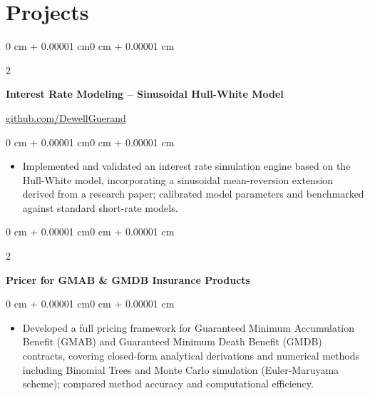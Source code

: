 \documentclass[10pt, letterpaper]{article}
\newenvironment{highlights}{
    \begin{itemize}[
        topsep=0.06 cm,
        parsep=0.06 cm,
        partopsep=0pt,
        itemsep=0pt,
        leftmargin=0 cm + 10pt
    ]
}{
    \end{itemize}
}
\newenvironment{onecolentry}{
    \begin{adjustwidth}{0 cm + 0.00001 cm}{0 cm + 0.00001 cm}
}{
    \end{adjustwidth}
}
\newenvironment{twocolentry}[2][]{
    \onecolentry
    \def\secondColumn{#2}
    \setcolumnwidth{\fill, 4.5 cm}
    \begin{paracol}{2}
}{
    \switchcolumn \raggedleft \secondColumn
    \end{paracol}
    \endonecolentry
}
\begin{document}
    \section{Projects}

        \begin{twocolentry}{\href{https://github.com/DewellGuerand}{github.com/DewellGuerand}}
            \textbf{Interest Rate Modeling -- Sinusoidal Hull-White Model}
        \end{twocolentry}
        \vspace{0.06 cm}
        \begin{onecolentry}
            \begin{highlights}
                \item Implemented and validated an interest rate simulation engine based on the Hull-White model, incorporating a sinusoidal mean-reversion extension derived from a research paper; calibrated model parameters and benchmarked against standard short-rate models.
            \end{highlights}
        \end{onecolentry}

        \vspace{0.06 cm}

        \begin{twocolentry}{}
            \textbf{Pricer for GMAB \& GMDB Insurance Products}
        \end{twocolentry}
        \vspace{0.06 cm}
        \begin{onecolentry}
            \begin{highlights}
                \item Developed a full pricing framework for Guaranteed Minimum Accumulation Benefit (GMAB) and Guaranteed Minimum Death Benefit (GMDB) contracts, covering closed-form analytical derivations and numerical methods including Binomial Trees and Monte Carlo simulation (Euler-Maruyama scheme); compared method accuracy and computational efficiency.
            \end{highlights}
        \end{onecolentry}

        \vspace{0.06 cm}
\end{document}
